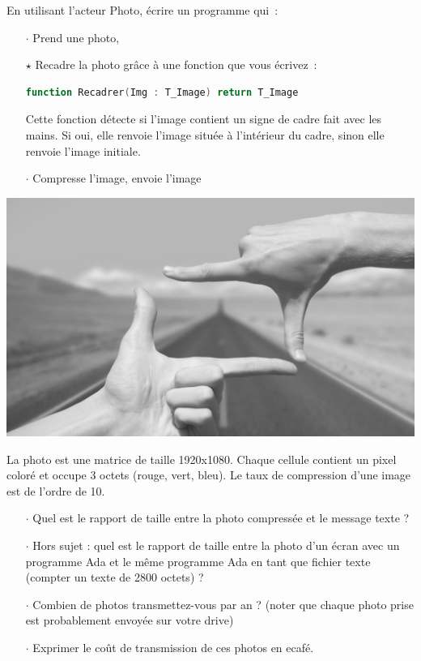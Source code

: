 \begin{minipage}[t]{0.74\textwidth}
En utilisant l'acteur Photo, écrire un programme qui~:

\begin{itemize}
\item[$\cdot$] Prend une photo,
\item[$\star$] Recadre la photo grâce à une fonction que vous écrivez~:
  \begin{lstlisting}[language=Ada]
    function Recadrer(Img : T_Image) return T_Image
  \end{lstlisting}
  Cette fonction détecte si l'image contient un signe de cadre fait avec les mains. Si oui, elle renvoie l'image située à l'intérieur du cadre, sinon elle renvoie l'image initiale.

\item[$\cdot$] Compresse l'image, envoie l'image
\end{itemize}
\end{minipage}
\hfill
\begin{minipage}[t]{0.25\textwidth}
\includegraphics[width=\linewidth,valign=t]{frame.png}
\end{minipage}
\medskip

La photo est une matrice de taille 1920x1080. Chaque cellule contient un pixel coloré et occupe 3 octets (rouge, vert, bleu).
Le taux de compression d'une image est de l'ordre de 10.

\begin{itemize}
\item[$\cdot$] Quel est le rapport de taille entre la photo compressée et le message texte ?
\item[$\cdot$] Hors sujet : quel est le rapport de taille entre la photo d'un écran avec un programme Ada et le même programme Ada en tant que fichier texte (compter un texte de 2800 octets) ?
\item[$\cdot$] Combien de photos transmettez-vous par an ? (noter que chaque photo prise est probablement envoyée sur votre drive)
\item[$\cdot$] Exprimer le coût de transmission de ces photos en ecafé.
\end{itemize}


